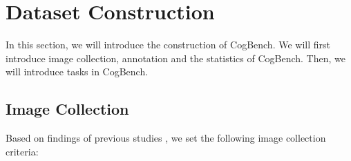 \section{Dataset Construction}

In this section, we will introduce the construction of CogBench. 
We will first introduce image collection, annotation and the statistics of CogBench.
Then, we will introduce tasks in CogBench.


\subsection{Image Collection}





Based on findings of previous studies \cite{describe-ctp, tasnim-etal-2022-depac}, we set the following image collection criteria: 


